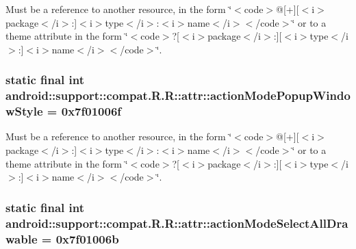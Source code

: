 Must be a reference to another resource, in the form \char`\"{}$<$code$>$@\mbox{[}+\mbox{]}\mbox{[}$<$i$>$package$<$/i$>$:\mbox{]}$<$i$>$type$<$/i$>$:$<$i$>$name$<$/i$>$$<$/code$>$\char`\"{} or to a theme attribute in the form \char`\"{}$<$code$>$?\mbox{[}$<$i$>$package$<$/i$>$:\mbox{]}\mbox{[}$<$i$>$type$<$/i$>$:\mbox{]}$<$i$>$name$<$/i$>$$<$/code$>$\char`\"{}. \hypertarget{classandroid_1_1support_1_1compat_1_1_r_1_1attr_34664da0af10fe3f1cf49842d0883d03}{
\subsubsection[{actionModePopupWindowStyle}]{\setlength{\rightskip}{0pt plus 5cm}static final int android::support::compat.R.R::attr::actionModePopupWindowStyle = 0x7f01006f}}
\label{classandroid_1_1support_1_1compat_1_1_r_1_1attr_34664da0af10fe3f1cf49842d0883d03}


Must be a reference to another resource, in the form \char`\"{}$<$code$>$@\mbox{[}+\mbox{]}\mbox{[}$<$i$>$package$<$/i$>$:\mbox{]}$<$i$>$type$<$/i$>$:$<$i$>$name$<$/i$>$$<$/code$>$\char`\"{} or to a theme attribute in the form \char`\"{}$<$code$>$?\mbox{[}$<$i$>$package$<$/i$>$:\mbox{]}\mbox{[}$<$i$>$type$<$/i$>$:\mbox{]}$<$i$>$name$<$/i$>$$<$/code$>$\char`\"{}. \hypertarget{classandroid_1_1support_1_1compat_1_1_r_1_1attr_30d6c6e1dcc39bd5e43ff12fc2f2d540}{
\subsubsection[{actionModeSelectAllDrawable}]{\setlength{\rightskip}{0pt plus 5cm}static final int android::support::compat.R.R::attr::actionModeSelectAllDrawable = 0x7f01006b}}
\label{classandroid_1_1support_1_1compat_1_1_r_1_1attr_30d6c6e1dcc39bd5e43ff12fc2f2d540}


